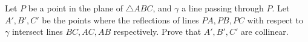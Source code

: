 Let $P$ be a point in the plane of $\triangle ABC$, and $\gamma$ a line passing through $P$. Let $A', B', C'$ be the points where the reflections of lines $PA, PB, PC$ with respect to $\gamma$ intersect lines $BC, AC, AB$ respectively. Prove that $A', B', C'$ are collinear.